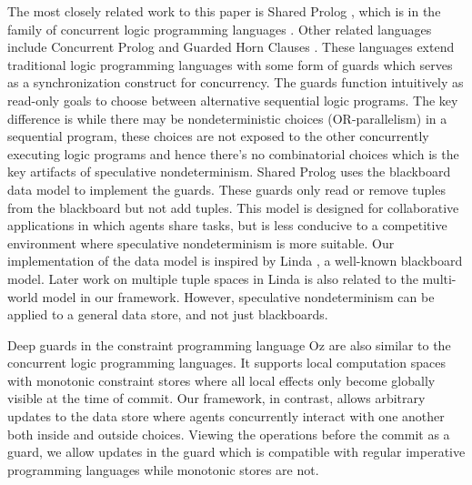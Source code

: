 The most closely related work to this paper is Shared Prolog \cite{BrogiC91},
which is in the family of concurrent
logic programming languages \cite{Shapiro89:CLP-survey}. Other related
languages include Concurrent Prolog \cite{ShapiroT83:ConProlog} and 
Guarded Horn Clauses \cite{Ueda85:guarded}. These languages extend 
traditional logic programming languages with some form of 
guards \cite{Dijkstra75:guarded} which serves as a synchronization
construct for concurrency. 
The guards function intuitively as read-only goals 
to choose between alternative sequential logic programs. 
The key difference is while there may be
nondeterministic choices (OR-parallelism) in a sequential program,
these choices are not exposed to the other concurrently executing
logic programs and hence there's no combinatorial choices 
which is the key artifacts of speculative nondeterminism.
Shared Prolog uses the blackboard data model to implement the guards.
These guards only read or remove tuples from
the blackboard but not add tuples. This model is designed for
collaborative applications in which agents share tasks,
but is less conducive to a competitive
environment where speculative nondeterminism is more
suitable. 
Our implementation of the data model is
inspired by Linda \cite{GelernterC92}, 
a well-known blackboard model. 
Later work on multiple tuple spaces in Linda \cite{Gelernter89multiple}
is also related to the multi-world model in our framework. 
However, speculative nondeterminism can be applied to 
a general data store, and not just blackboards.

Deep guards in the constraint programming language 
Oz \cite{SchulteSW94, Mehl:diss}
are also similar to the concurrent logic programming languages.
It supports local computation spaces with
monotonic constraint stores where all local
effects only become globally visible at the time of commit. 
Our framework, in contrast, allows arbitrary updates to the
data store where agents concurrently interact with one another 
both inside and outside choices.
Viewing the operations before the commit as a guard, 
we allow updates in the guard which is compatible with regular 
imperative programming languages while monotonic stores are not.

